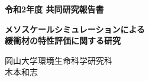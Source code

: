 ﻿\documentclass[11pt,a4j]{jarticle}
\newlength{\minitwocolumn}
\begin{document}
\newcommand{\fat}[1]{\mbox{\boldmath $#1$}}
\newcommand{\D}{\partial}
\newcommand{\w}{\omega}
\newcommand{\ga}{\alpha}
\newcommand{\gb}{\beta}
\newcommand{\gx}{\xi}
\newcommand{\gz}{\zeta}
\newcommand{\vhat}[1]{\hat{\fat{#1}}}
\newcommand{\spc}{\vspace{0.7\baselineskip}}
\newcommand{\halfspc}{\vspace{0.3\baselineskip}}

\newcommand{\twofig}[2]
 {
   \begin{figure}[h]
     \begin{minipage}[t]{\minitwocolumn}
         \begin{center}   #1
         \end{center}
     \end{minipage}
         \hspace{\columnsep}
     \begin{minipage}[t]{\minitwocolumn}
         \begin{center} #2
         \end{center}
     \end{minipage}
   \end{figure}
 }
\begin{center}
{\Large \bf 令和2年度 共同研究報告書}
\end{center}
\vspace{2mm}
\begin{center}
{\LARGE \bf 
メソスケールシミュレーションによる\\緩衝材の特性評価に関する研究} 
\end{center}
\begin{center}
岡山大学環境生命科学研究科\\
木本和志
\end{center}
\vspace{10mm}




\end{document}
